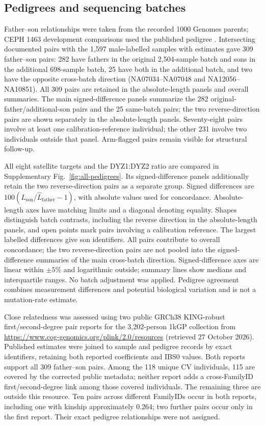 \documentclass[pdflatex,sn-nature]{sn-jnl}
\begin{document}
\subsection{Pedigrees and sequencing batches}\label{sec:m-pedigree}
Father--son relationships were taken from the recorded 1000 Genomes parents; CEPH 1463 development comparisons used the published pedigree \cite{Porubsky2025}. Intersecting documented pairs with the 1,597 male-labelled samples with estimates gave 309 father--son pairs: 282 have fathers in the original 2,504-sample batch and sons in the additional 698-sample batch, 25 have both in the additional batch, and two have the opposite cross-batch direction (NA07034--NA07048 and NA12056--NA10851). All 309 pairs are retained in the absolute-length panels and overall summaries. The main signed-difference panels summarize the 282 original-father/additional-son pairs and the 25 same-batch pairs; the two reverse-direction pairs are shown separately in the absolute-length panels. Seventy-eight pairs involve at least one calibration-reference individual; the other 231 involve two individuals outside that panel. Arm-flagged pairs remain visible for structural follow-up.

All eight satellite targets and the DYZ1:DYZ2 ratio are compared in Supplementary Fig.~\ref{fig:all-pedigrees}. Its signed-difference panels additionally retain the two reverse-direction pairs as a separate group. Signed differences are $100(\widehat L_{\mathrm{son}}/\widehat L_{\mathrm{father}}-1)$, with absolute values used for concordance. Absolute-length axes have matching limits and a diagonal denoting equality. Shapes distinguish batch contrasts, including the reverse direction in the absolute-length panels, and open points mark pairs involving a calibration reference. The largest labelled differences give son identifiers. All pairs contribute to overall concordance; the two reverse-direction pairs are not pooled into the signed-difference summaries of the main cross-batch direction. Signed-difference axes are linear within $\pm5\%$ and logarithmic outside; summary lines show medians and interquartile ranges. No batch adjustment was applied. Pedigree agreement combines measurement differences and potential biological variation and is not a mutation-rate estimate.

Close relatedness was assessed using two public GRCh38 KING-robust first/second-degree pair reports for the 3,202-person 1kGP collection from \url{https://www.cog-genomics.org/plink/2.0/resources} (retrieved 27 October 2026). Published estimates were joined to sample and pedigree records by exact identifiers, retaining both reported coefficients and IBS0 values. Both reports support all 309 father--son pairs. Among the 118 unique CV individuals, 115 are covered by the corrected public metadata; neither report adds a cross-FamilyID first/second-degree link among those covered individuals. The remaining three are outside this resource. Ten pairs across different FamilyIDs occur in both reports, including one with kinship approximately 0.264; two further pairs occur only in the first report. Their exact pedigree relationships were not assigned.
\end{document}
